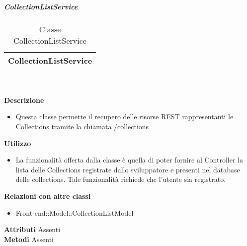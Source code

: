 			\subparagraph{CollectionListService} 
\begin{table}[ht]
\begin{center}
\bgroup
	\setlength{\arrayrulewidth}{0.6mm}
	\def\arraystretch{1}
		\begin{tabular}{ | p{12cm} | }
				\hline  
					\centerline{\textbf{CollectionListService}}
		\\ \hline 
				\hline
				\hline
		
		\end{tabular}
\egroup
\caption{Classe CollectionListService}
\end{center}
\end{table} \textbf{\\ \\ Descrizione}
\begin{itemize}
\item[] Questa classe permette il recupero delle risorse REST rappresentanti le Collections tramite la chiamata /collections
\end{itemize} 
\textbf{Utilizzo}
\begin{itemize}
\item[] La funzionalità offerta dalla classe è quella di poter fornire al Controller la lista delle Collections registrate dallo sviluppatore e presenti nel database delle collections.
Tale funzionalità richiede che l'utente sia registrato.
\end{itemize}
\textbf{Relazioni con altre classi}
\begin{itemize}
\item{Front-end::Model::CollectionListModel}
\end{itemize}
\textbf{Attributi}
Assenti \\
\textbf{Metodi}
Assenti \\

